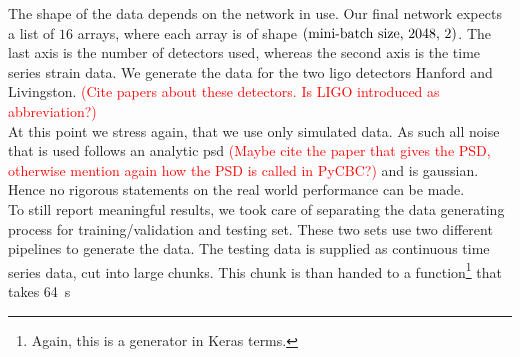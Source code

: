 The shape of the data depends on the network in use. Our final network expects a list of $16$ arrays, where each array is of shape ${\left( \text{mini-batch size, 2048, 2} \right)}$. The last axis is the number of detectors used, whereas the second axis is the time series strain data. We generate the data for the two \gls{ligo} detectors Hanford and Livingston. \textcolor{red}{(Cite papers about these detectors. Is LIGO introduced as abbreviation?)}\\
At this point we stress again, that we use only simulated data. As such all noise that is used follows an analytic \gls{psd} \textcolor{red}{(Maybe cite the paper that gives the PSD, otherwise mention again how the PSD is called in PyCBC?)} and is gaussian. Hence no rigorous statements on the real world performance can be made.\medskip\\
To still report meaningful results, we took care of separating the data generating process for training/validation and testing set. These two sets use two different pipelines to generate the data. The testing data is supplied as continuous time series data, cut into large chunks. This chunk is than handed to a function\footnote{Again, this is a generator in Keras terms.} that takes \SI{64}{\s}

